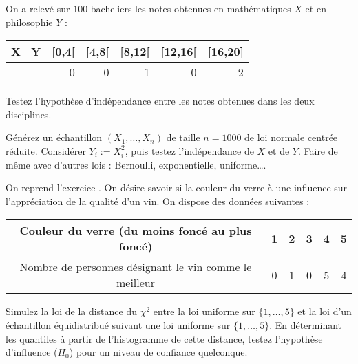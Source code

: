 \begin{exo}
  On a relevé sur $100$ bacheliers les notes obtenues en mathématiques $X$ et
  en philosophie $Y$ :
 \begin{center}
 \begin{tabular}{|l||r|r|r|r|r|} \hline
  X \ Y & [0,4[ & [4,8[ & [8,12[ & [12,16[ & [16,20] \\ \hline\hline
  [0,4[&3&4&2&0&0\\ \hline
  [4,8[&6&10&8&2&0\\ \hline
  [8,12[&1&8&20&12&3\\ \hline
  [12,16[&0&0&8&7&3\\ \hline
  [16,20]&0&0&1&0&2\\ \hline
 \end{tabular} 
 \end{center}
 Testez l'hypothèse d'indépendance entre les notes obtenues dans les deux
 disciplines.
\end{exo}

\begin{exo}
  Générez un échantillon $(X_1,\ldots,X_n)$ de taille $n=1000$ de loi normale
  centrée réduite. Considérer $Y_i:=X_i^2$, puis testez l'indépendance de $X$
  et de $Y$. Faire de même avec d'autres lois : Bernoulli, exponentielle,
  uniforme\ldots.
\end{exo}

\begin{exo}
  On reprend l'exercice \cite[page 97]{tomassone}. On désire
  savoir si la couleur du verre à une influence sur l'appréciation de la
  qualité d'un vin. On dispose des données suivantes :
 \begin{center}
 \begin{tabular}{|c|c|c|c|c|c|}
  \hline Couleur du verre (du moins foncé au plus foncé)&1&2&3&4&5  \\
  \hline Nombre de personnes désignant le vin comme le meilleur & 0&1&0&5&4 \\
  \hline
 \end{tabular}
 \end{center}
 Simulez la loi de la distance du $\chi^2$ entre la loi uniforme sur
 $\{1,\ldots,5\}$ et la loi d'un échantillon équidistribué suivant une loi
 uniforme sur $\{1,\ldots,5\}$. En déterminant les quantiles à partir de
 l'histogramme de cette distance, testez l'hypothèse d'influence ($H_0$) pour
 un niveau de confiance quelconque.
\end{exo}


